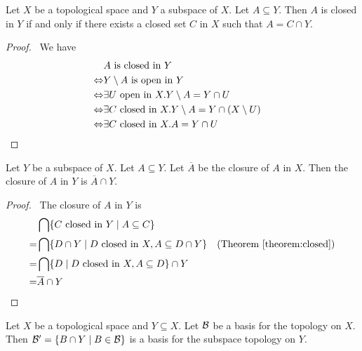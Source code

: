 \begin{theorem}
    \label{theorem:closed}
    Let $X$ be a topological space and $Y$ a subspace of $X$. Let $A \subseteq Y$. Then $A$ is closed in $Y$
    if and only if there exists a closed set $C$ in $X$ such that $A = C \cap Y$.
\end{theorem}

\begin{proof}
    \pf\ 
    We have
    \begin{align*}
        & A \text{ is closed in } Y \\
        \Leftrightarrow & Y \setminus A \text{ is open in } Y \\
        \Leftrightarrow & \exists U \text{ open in } X. Y \setminus A = Y \cap U \\
        \Leftrightarrow & \exists C \text{ closed in } X. Y \setminus A = Y \cap (X \setminus U) \\
        \Leftrightarrow & \exists C \text{ closed in } X. A = Y \cap U & \qed
    \end{align*}
\end{proof}

\begin{theorem}
    Let $Y$ be a subspace of $X$. Let $A \subseteq Y$. Let $\overline{A}$ be the closure of $A$ in $X$.
    Then the closure of $A$ in $Y$ is $\overline{A} \cap Y$.
\end{theorem}

\begin{proof}
    \pf\ The closure of $A$ in $Y$ is
    \begin{align*}
        & \bigcap \{ C \text{ closed in } Y \mid A \subseteq C \} \\
        = & \bigcap \{ D \cap Y \mid D \text{ closed in } X, A \subseteq D \cap Y \} 
            & (\text{Theorem \ref{theorem:closed}})\\
        = & \bigcap \{ D \mid D \text{ closed in } X, A \subseteq D \} \cap Y \\
        = & \overline{A} \cap Y & \qed
    \end{align*}
\end{proof}

\begin{lemma}
    \label{lemma:subspace_basis}
    Let $X$ be a topological space and $Y \subseteq X$. Let $\BB$ be a basis for the topology on $X$.
    Then $\BB' = \{ B \cap Y \mid B \in \BB \}$ is a basis for the subspace topology on $Y$.
\end{lemma}

